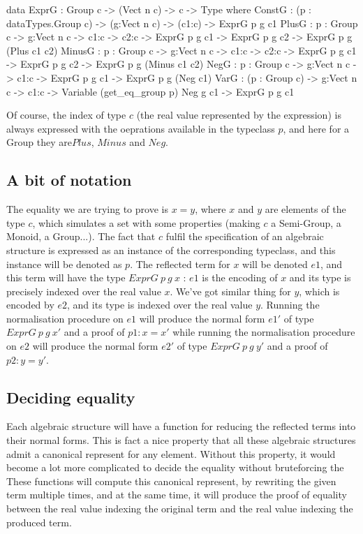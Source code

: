 \documentclass{sigplanconf}
\begin{document}
\begin{code}[caption=Reflected terms in a Group, captionpos=b, label=lst1:haskell2]
data ExprG :  Group c -> (Vect n c) -> c -> 
              Type where
    ConstG : (p : dataTypes.Group c) 
       -> (g:Vect n c)
       -> (c1:c) -> ExprG p g c1
    PlusG : {p : Group c} -> {g:Vect n c} 
       -> {c1:c} -> {c2:c} 
       -> ExprG p g c1 
       -> ExprG p g c2 
       -> ExprG p g (Plus c1 c2)
    MinusG : {p : Group c} -> {g:Vect n c} 
       -> {c1:c} -> {c2:c} 
       -> ExprG p g c1 
       -> ExprG p g c2 
       -> ExprG p g (Minus c1 c2)
    NegG : {p : Group c} -> {g:Vect n c} 
       -> {c1:c} -> ExprG p g c1 
       -> ExprG p g (Neg c1)
    VarG : (p : Group c) -> {g:Vect n c} 
       -> {c1:c}
       -> Variable (get_eq_group p) Neg g c1 
       -> ExprG p g c1
\end{code}

Of course, the index of type $c$ (the real value represented by the expression) is always expressed with the oeprations available in the typeclass $p$, and here for a Group they are$Plus$, $Minus$ and $Neg$.

	\subsection { A bit of notation}
The equality we are trying to prove is $x=y$, where $x$ and $y$ are elements of the type $c$, which  simulates a set with some properties (making $c$ a Semi-Group, a Monoid, a Group...). The fact that $c$ fulfil the specification of an algebraic structure is expressed as an instance of the corresponding typeclass, and this instance will be denoted as $p$.
The reflected term for $x$ will be denoted $e1$, and this term will have the type $ExprG\ p\ g\ x$ : $e1$ is the encoding of $x$ and its type is precisely indexed over the real value $x$.
We've got similar thing for $y$, which is encoded by $e2$, and its type is indexed over the real value $y$.
Running the normalisation procedure on $e1$ will produce the normal form $e1'$ of type $ExprG\ p\ g\ x'$ and a proof of $p1:x=x'$ while running the normalisation procedure on $e2$ will produce the normal form $e2'$ of type $ExprG\ p\ g\ y'$ and a proof of $p2:y=y'$.

	\subsection {Deciding equality}
	
Each algebraic structure will have a function for reducing the reflected terms into their normal forms. This is fact a nice property that all these algebraic structures admit a canonical represent for any element. Without this property, it would become a lot more complicated to decide the equality without bruteforcing the 
These functions will compute this canonical represent, by rewriting the given term multiple times, and at the same time, it will produce the proof of equality between the real value indexing the original term and the real value indexing the produced term.
\end{document}
